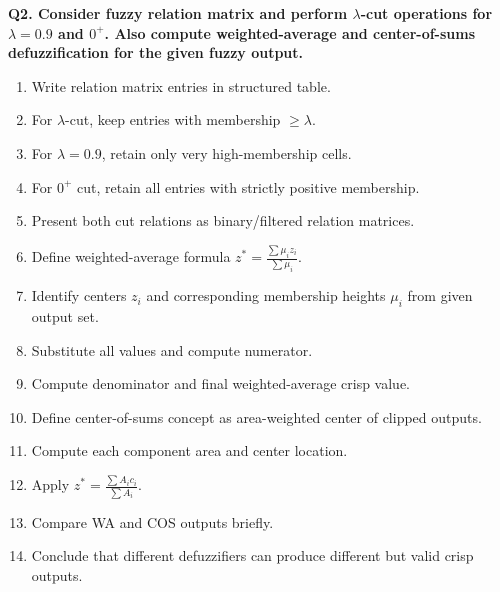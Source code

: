 \documentclass[11pt,a4paper]{article}
\begin{document}
\textbf{Q2. Consider fuzzy relation matrix and perform $\lambda$-cut operations for $\lambda=0.9$ and $0^+$. Also compute weighted-average and center-of-sums defuzzification for the given fuzzy output.}
\begin{enumerate}
\item Write relation matrix entries in structured table.
\item For $\lambda$-cut, keep entries with membership $\ge\lambda$.
\item For $\lambda=0.9$, retain only very high-membership cells.
\item For $0^+$ cut, retain all entries with strictly positive membership.
\item Present both cut relations as binary/filtered relation matrices.
\item Define weighted-average formula $z^*=\frac{\sum \mu_i z_i}{\sum\mu_i}$.
\item Identify centers $z_i$ and corresponding membership heights $\mu_i$ from given output set.
\item Substitute all values and compute numerator.
\item Compute denominator and final weighted-average crisp value.
\item Define center-of-sums concept as area-weighted center of clipped outputs.
\item Compute each component area and center location.
\item Apply $z^*=\frac{\sum A_i c_i}{\sum A_i}$.
\item Compare WA and COS outputs briefly.
\item Conclude that different defuzzifiers can produce different but valid crisp outputs.
\end{enumerate}
\end{document}
